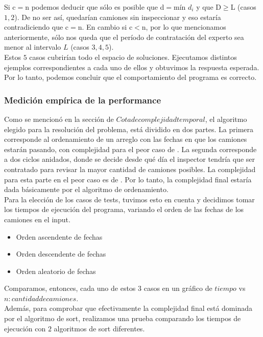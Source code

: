 \documentclass[11pt, a4paper, twoside]{article}
\begin{document}
Si c$=$n podemos deducir que sólo es posible que d$=$mín $d_i$ y que D$\ge$L (casos $1,2$). De no ser así, quedarían camiones sin inspeccionar y eso estaría contradiciendo que c$=$n. En cambio si c$<$n, por lo que mencionamos anteriormente, sólo nos queda que el período de contratación del experto sea menor al intervalo $L$ (casos $3,4,5$). \\
Estos $5$ casos cubrirían todo el espacio de soluciones. Ejecutamos distintos ejemplos correspondientes a cada uno de ellos y obtuvimos la respuesta esperada. Por lo tanto, podemos concluir que el comportamiento del programa es correcto. 

\subsubsection{Medición empírica de la performance}

Como se mencionó en la sección de $Cota de complejidad temporal$, el algoritmo elegido para la resolución del problema,
está dividido en dos partes. La primera corresponde al ordenamiento de un arreglo con las fechas en que los 
camiones estarán pasando, con complejidad para el peor caso de . La segunda corresponde a dos ciclos
anidados, donde se decide desde qué día el inspector tendría que ser contratado para revisar la mayor cantidad 
de camiones posibles. La complejidad para esta parte en el peor caso es de . Por lo tanto, la complejidad
final estaría dada básicamente por el algoritmo de ordenamiento. \\
Para la elección de los casos de tests, tuvimos esto en cuenta y decidimos tomar los tiempos de ejecución del programa,
variando el orden de las fechas de los camiones en el input. 

\begin{itemize}
\item Orden ascendente de fechas
\item Orden descendente de fechas
\item Orden aleatorio de fechas
\end{itemize}     

Comparamos, entonces, cada uno de estos $3$ casos en un gráfico de $tiempo$ vs $n: cantidad de camiones$. \\


Además, para comprobar que efectivamente la complejidad final está dominada por el algoritmo de sort, realizamos 
una prueba comparando los tiempos de ejecución con $2$ algoritmos de sort diferentes. \\

 

\end{document}
